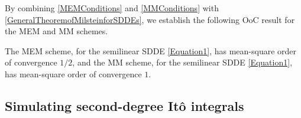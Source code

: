 \documentclass[onefignum]{siamart250211}
\begin{document}
By combining \cref{MEMConditions} and \cref{MMConditions} with \cref{GeneralTheoremofMilsteinforSDDEs}, we establish the following OoC result for the MEM and MM schemes.

\begin{theorem}\label{OoCTheorem}
The MEM scheme, for the semilinear SDDE \cref{Equation1}, has mean-square order of convergence $1/2$, and the MM scheme, for the semilinear SDDE \cref{Equation1}, has mean-square order of convergence $1$.
\end{theorem}








%
%
%
%
%





\subsection{Simulating second-degree It\^o integrals}
\end{document}
